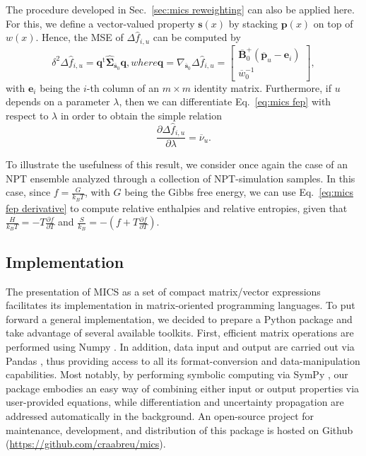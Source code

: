 \documentclass[journal=jctcce,manuscript=article]{achemso}
\newcommand{\mt}[1]{\boldsymbol{\mathbf{#1}}}   %
\newcommand{\vt}[1]{\boldsymbol{\mathbf{#1}}}   %
\newcommand{\tr}[1]{#1^\text{t}}                %
\newcommand{\diff}[2]{\frac{\partial #1}{\partial #2}} %
\newcommand{\avg}[1]{\overline{#1}}             %
\begin{document}
The procedure developed in Sec.~\ref{sec:mics reweighting} can also be applied here. For this, we define a vector-valued property $\vt s(x)$ by stacking $\vt p(x)$ on top of $w(x)$. Hence, the MSE of $\Delta {\hat f}_{i,u}$ can be computed by
\begin{subequations}
	\label{eq:mics fep uncertainty}
	\begin{equation}
	\label{eq:mics fep delta method}
	\delta^2 \Delta {\hat f}_{i,u} = \tr{\vt q} \hat{\mt \Sigma}_{\avg{\vt s}_0} {\vt q},
	\end{equation}
	where
	\begin{equation}
	\label{eq:mics fep gradient}
	{\vt q} = \nabla_{\avg{\vt s}_0} \Delta {\hat f}_{i,u} =
	\left[\begin{array}{c}
	\avg{\mt B}_0^+  (\avg{\vt p}_u - {\vt e}_i) \\
	\avg{w}_0^{-1}
	\end{array}\right],
	\end{equation}
\end{subequations}
with $\vt e_i$ being the $i$-th column of an $m \times m$ identity matrix. Furthermore, if $u$ depends on a parameter $\lambda$, then we can differentiate Eq.~\eqref{eq:mics fep} with respect to $\lambda$ in order to obtain the simple relation
\begin{equation}
\label{eq:mics fep derivative}
\diff{\Delta {\hat f}_{i,u}}{\lambda} = \avg{\nu}_u.
\end{equation}

To illustrate the usefulness of this result, we consider once again the case of an NPT ensemble analyzed through a collection of NPT-simulation samples. In this case, since $f = \frac{G}{k_B T}$, with $G$ being the Gibbs free energy, we can use Eq.~\eqref{eq:mics fep derivative} to compute relative enthalpies and relative entropies, given that $\frac{H}{k_B T} = - T \frac{\partial f}{\partial T}$ and $\frac{S}{k_B} = -(f + T \frac{\partial f}{\partial T})$.

\subsection{Implementation}

The presentation of MICS as a set of compact matrix/vector expressions facilitates its implementation in matrix-oriented programming languages. To put forward a general implementation, we decided to prepare a Python package and take advantage of several available toolkits. First, efficient matrix operations are performed using Numpy \cite{Van_der_walt_2011}. In addition, data input and output are carried out via Pandas \cite{Mckinney_2010}, thus providing access to all its format-conversion and data-manipulation capabilities. Most notably, by performing symbolic computing via SymPy \cite{Meurer_2017}, our package embodies an easy way of combining either input or output properties via user-provided equations, while differentiation and uncertainty propagation are addressed automatically in the background. An open-source project for maintenance, development, and distribution of this package is hosted on Github  (\url{https://github.com/craabreu/mics}).
\end{document}
